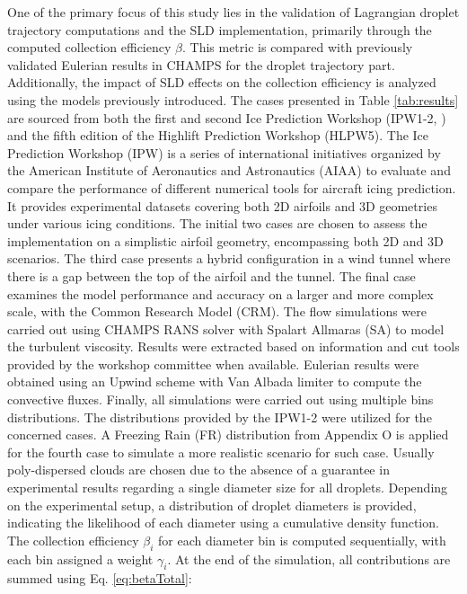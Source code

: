 One of the primary focus of this study lies in the validation of Lagrangian droplet trajectory computations and the SLD implementation, primarily through the computed collection efficiency $\beta$. This metric is compared with previously validated Eulerian results in CHAMPS \cite{bourgault2019ice} for the droplet trajectory part. Additionally, the impact of SLD effects on the collection efficiency is analyzed using the models previously introduced. The cases presented in Table \ref{tab:results} are sourced from both the first and second Ice Prediction Workshop (IPW1-2, \cite{laurendeau2022summary, laurendeau2024summary}) and the fifth edition of the Highlift Prediction Workshop (HLPW5). The Ice Prediction Workshop (IPW) is a series of international initiatives organized by the American Institute of Aeronautics and Astronautics (AIAA) to evaluate and compare the performance of different numerical tools for aircraft icing prediction. It provides experimental datasets covering both 2D airfoils and 3D geometries under various icing conditions. The initial two cases are chosen to assess the implementation on a simplistic airfoil geometry, encompassing both 2D and 3D scenarios. The third case presents a hybrid configuration in a wind tunnel where there is a gap between the top of the airfoil and the tunnel. The final case examines the model performance and accuracy on a larger and more complex scale, with the Common Research Model (CRM). The flow simulations were carried out using CHAMPS RANS solver with Spalart Allmaras (SA) to model the turbulent viscosity. Results were extracted based on information and cut tools provided by the workshop committee when available. Eulerian results were obtained using an Upwind scheme with Van Albada limiter to compute the convective fluxes. Finally, all simulations were carried out using multiple bins distributions. The distributions provided by the IPW1-2 were utilized for the concerned cases. A Freezing Rain (FR) distribution from Appendix O is applied for the fourth case to simulate a more realistic scenario for such case. Usually poly-dispersed clouds are chosen due to the absence of a guarantee in experimental results regarding a single diameter size for all droplets. Depending on the experimental setup, a distribution of droplet diameters is provided, indicating the likelihood of each diameter using a cumulative density function. The collection efficiency $\beta_i$ for each diameter bin is computed sequentially, with each bin assigned a weight $\gamma_i$. At the end of the simulation, all contributions are summed using Eq. \ref{eq:betaTotal}:

